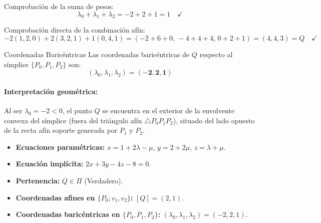 \documentclass[11pt,a4paper]{article}
\begin{document}
Comprobación de la suma de pesos:
\[
\lambda_0 + \lambda_1 + \lambda_2 = -2 + 2 + 1 = 1 \quad \checkmark
\]

Comprobación directa de la combinación afín:
\[
-2(1, 2, 0) + 2(3, 2, 1) + 1(0, 4, 1) = (-2+6+0,\, -4+4+4,\, 0+2+1) = (4, 4, 3) = Q \quad \checkmark
\]

\begin{solbox}{Coordenadas Baricéntricas}
Las coordenadas baricéntricas de $Q$ respecto al símplice $\{P_0, P_1, P_2\}$ son:
\[
(\lambda_0, \lambda_1, \lambda_2) = \bm{(-2, 2, 1)}
\]
\end{solbox}

\paragraph{Interpretación geométrica:} Al ser $\lambda_0 = -2 < 0$, el punto $Q$ se encuentra en el exterior de la envolvente convexa del símplice (fuera del triángulo afín $\triangle P_0 P_1 P_2$), situado del lado opuesto de la recta afín soporte generada por $P_1$ y $P_2$.

\vspace{0.4cm}

\begin{resumenbox}
\begin{itemize}
    \item \textbf{Ecuaciones paramétricas:} $x = 1 + 2\lambda - \mu$, \quad $y = 2 + 2\mu$, \quad $z = \lambda + \mu$.
    \item \textbf{Ecuación implícita:} $2x + 3y - 4z - 8 = 0$.
    \item \textbf{Pertenencia:} $Q \in \Pi$ (Verdadero).
    \item \textbf{Coordenadas afines en $\{P_0; v_1, v_2\}$:} $[Q] = (2, 1)$.
    \item \textbf{Coordenadas baricéntricas en $\{P_0, P_1, P_2\}$:} $(\lambda_0, \lambda_1, \lambda_2) = (-2, 2, 1)$.
\end{itemize}
\end{resumenbox}
\end{document}
